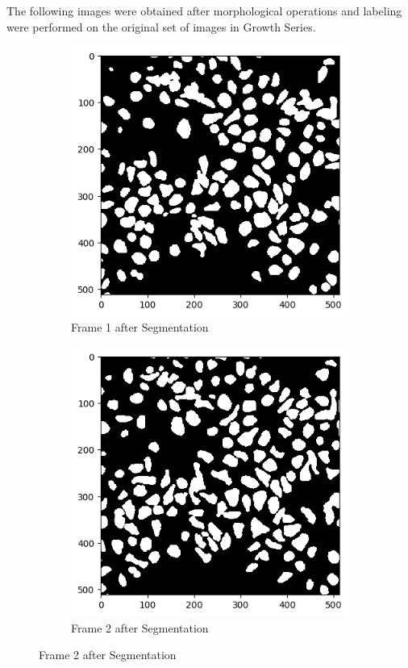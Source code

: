 \documentclass{article}
\begin{document}
The following images were obtained after morphological operations and labeling were performed on the original set of images in Growth Series. 
\begin{figure}[h!]
  \centering
  \begin{subfigure}{0.4\textwidth}
    \includegraphics[width=\linewidth]{Report/Appendix_Images/Segmentation-B-Growth/frame_1.png}
    \caption*{Frame 1 after Segmentation}
  \end{subfigure}
  \hfill
  \begin{subfigure}{0.4\textwidth}
    \includegraphics[width=\linewidth]{Report/Appendix_Images/Segmentation-B-Growth/frame_2.png}
    \caption*{Frame 2 after Segmentation}
  \end{subfigure}


\end{figure}
\end{document}
